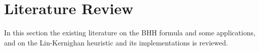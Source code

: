 \section{Literature Review}
In this section the existing literature on the BHH formula and some applications,
and on the Lin-Kernighan heuristic and its implementations is reviewed.




